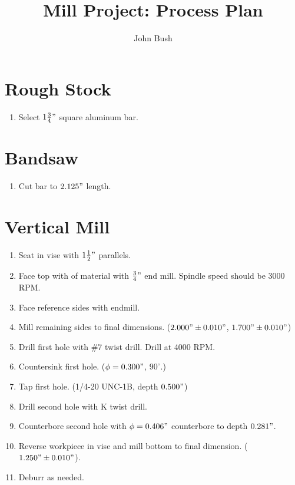 \documentclass{article}
\begin{document}
\title{Mill Project: Process Plan}
\author{John Bush}

\maketitle

\section*{Rough Stock}

\begin{enumerate}
	\item Select $1 \frac{3}{4}"$ square aluminum bar.
\end{enumerate}

\section*{Bandsaw}

\begin{enumerate}[resume]
	\item Cut bar to $2.125"$ length.
\end{enumerate}

\section*{Vertical Mill}

\begin{enumerate}[resume]
	\item Seat in vise with $1 \frac{1}{2}"$ parallels.

	\item Face top with of material with $\frac{3}{4}"$ end mill.  Spindle speed should be 3000 RPM.

	\item Face reference sides with endmill.

	\item Mill remaining sides to final dimensions. ($2.000" \pm 0.010"$, $1.700" \pm 0.010"$)

	\item Drill first hole with \#7 twist drill.  Drill at 4000 RPM.

	\item Countersink first hole. ($\phi = 0.300"$, $90^{\circ}$.)

	\item Tap first hole. (1/4-20 UNC-1B, depth $0.500"$)

	\item Drill second hole with K twist drill.

	\item Counterbore second hole with $\phi = 0.406"$ counterbore to depth $0.281"$.

	\item Reverse workpiece in vise and mill bottom to final dimension. ($1.250" \pm 0.010"$).

	\item Deburr as needed.

\end{enumerate}
\end{document}
